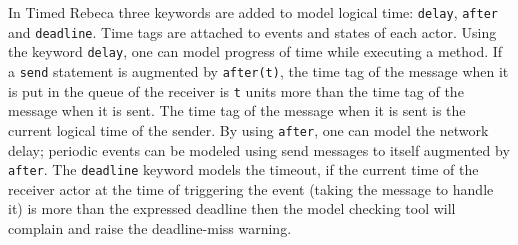 \documentclass[
graybox,
envcountchap
]{svmult}
\begin{document}
\begin{bibunit}
In Timed Rebeca three keywords are added to model logical time: \texttt{delay}, \texttt{after} and \texttt{deadline}. Time tags are attached to events and states of each actor. Using the keyword \texttt{delay}, one can model progress of time while executing a method. If a \texttt{send} statement is augmented by \texttt{after(t)},  the time tag  of the message when it is put in the queue of the receiver is \texttt{t} units more than the time tag of the message when it is sent. The time tag of the message when it is sent is the current logical time of the sender. By using \texttt{after}, one can model the network delay; periodic events can be modeled using send messages to itself augmented by  \texttt{after}.
The \texttt{deadline} keyword models the timeout, if the current time of the receiver actor at the time of triggering the event (taking the message to handle it) is more than the expressed deadline then the model checking tool will complain and raise the deadline-miss warning.






\end{bibunit}
\end{document}
